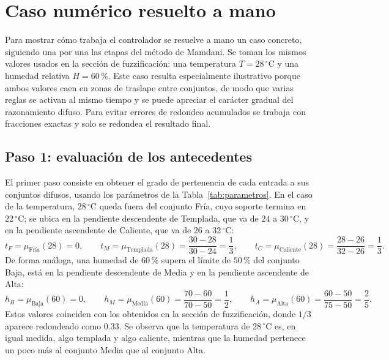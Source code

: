 \documentclass[11pt]{article}
\begin{document}
\section{Caso numérico resuelto a mano}
\label{sec:caso}

Para mostrar cómo trabaja el controlador se resuelve a mano un caso concreto, siguiendo una por una las etapas del método de Mamdani. Se toman los mismos valores usados en la sección de fuzzificación: una temperatura $T = 28\,^\circ$C y una humedad relativa $H = 60\,\%$. Este caso resulta especialmente ilustrativo porque ambos valores caen en zonas de traslape entre conjuntos, de modo que varias reglas se activan al mismo tiempo y se puede apreciar el carácter gradual del razonamiento difuso. Para evitar errores de redondeo acumulados se trabaja con fracciones exactas y solo se redondea el resultado final.

\subsection{Paso 1: evaluación de los antecedentes}

El primer paso consiste en obtener el grado de pertenencia de cada entrada a sus conjuntos difusos, usando los parámetros de la Tabla~\ref{tab:parametros}. En el caso de la temperatura, $28\,^\circ$C queda fuera del conjunto Fría, cuyo soporte termina en $22\,^\circ$C; se ubica en la pendiente descendente de Templada, que va de $24$ a $30\,^\circ$C, y en la pendiente ascendente de Caliente, que va de $26$ a $32\,^\circ$C:
\[
t_F = \mu_{\text{Fría}}(28) = 0, \qquad
t_M = \mu_{\text{Templada}}(28) = \frac{30 - 28}{30 - 24} = \frac{1}{3}, \qquad
t_C = \mu_{\text{Caliente}}(28) = \frac{28 - 26}{32 - 26} = \frac{1}{3}.
\]
De forma análoga, una humedad de $60\,\%$ supera el límite de $50\,\%$ del conjunto Baja, está en la pendiente descendente de Media y en la pendiente ascendente de Alta:
\[
h_B = \mu_{\text{Baja}}(60) = 0, \qquad
h_M = \mu_{\text{Media}}(60) = \frac{70 - 60}{70 - 50} = \frac{1}{2}, \qquad
h_A = \mu_{\text{Alta}}(60) = \frac{60 - 50}{75 - 50} = \frac{2}{5}.
\]
Estos valores coinciden con los obtenidos en la sección de fuzzificación, donde $1/3$ aparece redondeado como $0.33$. Se observa que la temperatura de $28\,^\circ$C es, en igual medida, algo templada y algo caliente, mientras que la humedad pertenece un poco más al conjunto Media que al conjunto Alta.
\end{document}
